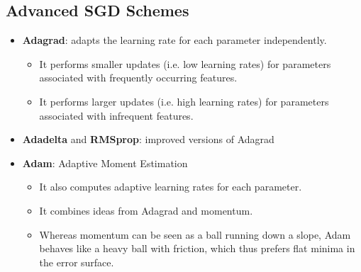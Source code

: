 \documentclass[12pt]{report}
\theoremstyle{plain}
\begin{document}
\begin{flushleft}
\subsection*{Advanced SGD Schemes}
\begin{itemize}
	\item \textbf{Adagrad}: adapts the learning rate for each parameter independently.
	\begin{itemize}
		\item It performs smaller updates (i.e. low learning rates) for parameters associated
		with frequently occurring features.
		\item It performs larger updates (i.e. high learning rates) for parameters associated
		with infrequent features.
	\end{itemize}
	\item \textbf{Adadelta} and \textbf{RMSprop}: improved versions of Adagrad
	\item \textbf{Adam}: Adaptive Moment Estimation
	\begin{itemize}
		\item It also computes adaptive learning rates for each parameter.
		\item It combines ideas from Adagrad and momentum.
		\item Whereas momentum can be seen as a ball running down a slope, Adam
		behaves like a heavy ball with friction, which thus prefers flat minima in the
		error surface.
	\end{itemize}
\end{itemize}




\end{flushleft}
\end{document}
